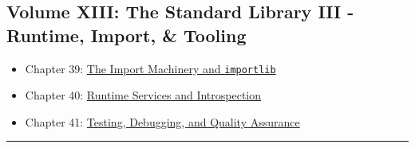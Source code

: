 \hypertarget{volume-xiii-the-standard-library-iii---runtime-import-tooling}{%
\subsection{Volume XIII: The Standard Library III - Runtime, Import, \&
Tooling}\label{volume-xiii-the-standard-library-iii---runtime-import-tooling}}

\begin{itemize}
\tightlist
\item
  Chapter 39:
  \protect\hyperlink{chapter-39-the-import-machinery-and-importlib}{The
  Import Machinery and \passthrough{\lstinline!importlib!}}
\item
  Chapter 40:
  \protect\hyperlink{chapter-40-runtime-services-and-introspection}{Runtime
  Services and Introspection}
\item
  Chapter 41:
  \protect\hyperlink{chapter-41-testing-debugging-and-quality-assurance}{Testing,
  Debugging, and Quality Assurance}
\end{itemize}

\begin{center}\rule{0.5\linewidth}{0.5pt}\end{center}
